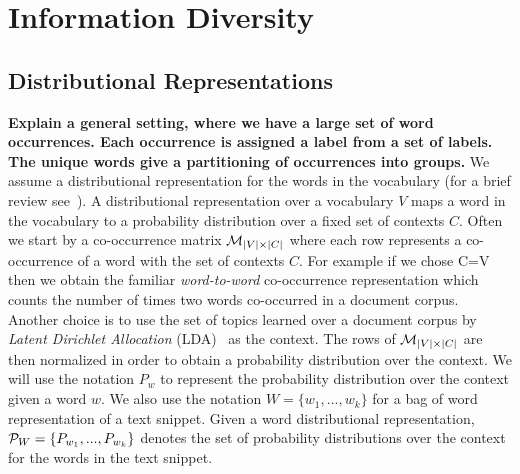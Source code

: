 \documentclass{article}
\begin{document}

\section{Information Diversity}
\label{sec:Information Diversity}
\subsection{Distributional Representations}
\label{sec:distributional-representations}
{\bf Explain a general setting, where we have a large set of word
  occurrences. Each occurrence is assigned a label from a set of
  labels. The unique words give a partitioning of occurrences into groups.}
We assume a distributional representation for the words in the vocabulary (for a brief review
see~\cite{Turian10wordrepresentations}). A distributional representation over a vocabulary $V$ maps a word in the vocabulary to a 
probability distribution over a fixed set of contexts $C$. Often we start by a co-occurrence matrix ${\mathcal M}_{|V|\times|C|}$ where each row represents a co-occurrence of a word with the set of contexts
$C$. For example if we chose C=V then we obtain the familiar {\sl word-to-word} co-occurrence representation which counts the number
of times two words co-occurred in a document corpus. Another choice is to use the set of topics learned over a document
corpus by {\sl Latent Dirichlet Allocation} (LDA)~\cite{Blei:2003:LDA:944919.944937} as the context. The rows of ${\mathcal M}_{|V|\times|C|}$
are then normalized in order to obtain a probability distribution over the context. We will use the notation $P_w$ to represent
the probability distribution over the context  given a word $w$. We also use the notation $W=\{w_1,...,w_k\}$ for a bag of word representation of a text snippet. Given a word distributional representation, ${\mathcal P}_{W}=\{P_{w_1},...,P_{w_k}\}$ denotes the set of probability distributions over the context for the words
in the text snippet.

\end{document}
